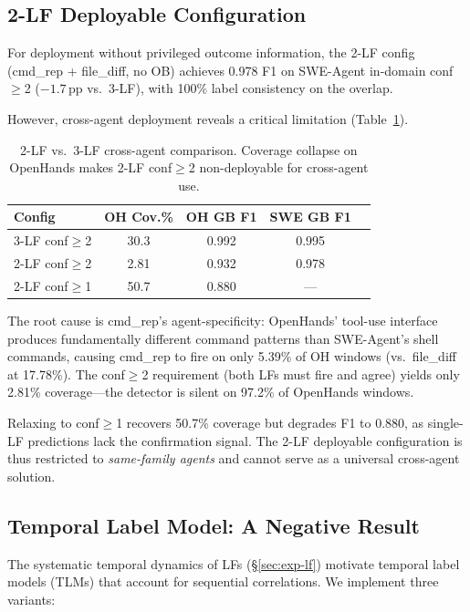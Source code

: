 \documentclass[11pt,a4paper]{article}
\begin{document}
\subsection{2-LF Deployable Configuration}
\label{sec:exp-2lf}

For deployment without privileged outcome information, the 2-LF config (cmd\_rep + file\_diff, no OB) achieves 0.978 F1 on SWE-Agent in-domain conf$\geq$2 ($-1.7$\,pp vs.\ 3-LF), with 100\% label consistency on the overlap.

However, cross-agent deployment reveals a critical limitation (Table~\ref{tab:2lf}).

\begin{table}[t]
\centering
\small
\begin{tabular}{lcccc}
\toprule
\textbf{Config} & \textbf{OH Cov.\%} & \textbf{OH GB F1} & \textbf{SWE GB F1} \\
\midrule
3-LF conf$\geq$2 & 30.3 & 0.992 & 0.995 \\
2-LF conf$\geq$2 & 2.81 & 0.932 & 0.978 \\
2-LF conf$\geq$1 & 50.7 & 0.880 & --- \\
\bottomrule
\end{tabular}
\caption{2-LF vs.\ 3-LF cross-agent comparison. Coverage collapse on OpenHands makes 2-LF conf$\geq$2 non-deployable for cross-agent use.}
\label{tab:2lf}
\end{table}

The root cause is cmd\_rep's agent-specificity: OpenHands' tool-use interface produces fundamentally different command patterns than SWE-Agent's shell commands, causing cmd\_rep to fire on only 5.39\% of OH windows (vs.\ file\_diff at 17.78\%).
The conf$\geq$2 requirement (both LFs must fire and agree) yields only 2.81\% coverage---the detector is silent on 97.2\% of OpenHands windows.

Relaxing to conf$\geq$1 recovers 50.7\% coverage but degrades F1 to 0.880, as single-LF predictions lack the confirmation signal.
The 2-LF deployable configuration is thus restricted to \emph{same-family agents} and cannot serve as a universal cross-agent solution.

\subsection{Temporal Label Model: A Negative Result}
\label{sec:exp-tlm}

The systematic temporal dynamics of LFs (\S\ref{sec:exp-lf}) motivate temporal label models (TLMs) that account for sequential correlations.
We implement three variants:
\end{document}
